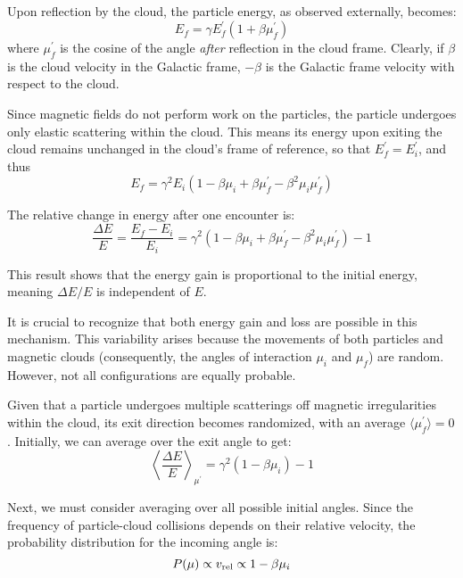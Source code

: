 Upon reflection by the cloud, the particle energy, as observed externally, becomes:
\begin{equation}
E_f  = \gamma E_f^\prime \left(1+ \beta \mu^\prime_f \right) 
\end{equation}
where \( \mu^\prime_f \) is the cosine of the angle \emph{after} reflection in the cloud frame. Clearly, if $\beta$ is the cloud velocity in the Galactic frame, $-\beta$ is the Galactic frame velocity with respect to the cloud.

Since magnetic fields do not perform work on the particles, the particle undergoes only elastic scattering within the cloud. This means its energy upon exiting the cloud remains unchanged in the cloud's frame of reference, so that \( E^\prime_f = E^\prime_i \), and thus
%
\begin{equation}
E_f = \gamma^2 E_i \left(1 - \beta \mu_i + \beta \mu^\prime_f - \beta^2 \mu_i \mu^\prime_f \right)
\end{equation}

The relative change in energy after one encounter is:
%
\begin{equation}
\frac{\Delta E}{E} = \frac{E_f - E_i}{E_i} =
\gamma^2  \left(1 - \beta \mu_i + \beta \mu^\prime_f - \beta^2 \mu_i \mu^\prime_f \right) - 1
\end{equation}

This result shows that the energy gain is proportional to the initial energy, meaning \( \Delta E/E \) is independent of \( E \).

It is crucial to recognize that both energy gain and loss are possible in this mechanism. This variability arises because the movements of both particles and magnetic clouds (consequently, the angles of interaction \( \mu_i \) and \( \mu_f \)) are random. 
%
However, not all configurations are equally probable.

Given that a particle undergoes multiple scatterings off magnetic irregularities within the cloud, its exit direction becomes randomized, with an average \( \langle \mu^\prime_f \rangle = 0 \). 
%
Initially, we can average over the exit angle to get:
%
\begin{equation}
\left\langle \frac{\Delta E}{E} \right\rangle_{\mu^\prime} = 
\gamma^2 \left( 1 - \beta \mu_i \right) - 1
\end{equation}

Next, we must consider averaging over all possible initial angles. Since the frequency of particle-cloud collisions depends on their relative velocity, the probability distribution for the incoming angle is:
\begin{equation}
P(\mu) \propto v_{\rm{rel}} \propto 1 - \beta \mu_i  
\end{equation}

